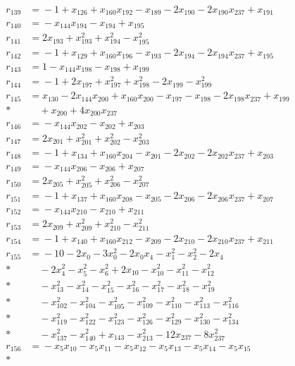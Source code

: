 \documentclass[11pt]{article}
\theoremstyle{remark}\newtheorem{remark}[theorem]{Remark}
\begin{document}
\begin{align*}
r_{139}&={}-1+x_{126}+x_{160}x_{192}-x_{189}-2x_{190}-2x_{190}x_{237}+x_{191}\\[2pt]
r_{140}&={}-x_{144}x_{194}-x_{194}+x_{195}\\[2pt]
r_{141}&={}2x_{193}+x_{193}^{2}+x_{194}^{2}-x_{195}^{2}\\[2pt]
r_{142}&={}-1+x_{129}+x_{160}x_{196}-x_{193}-2x_{194}-2x_{194}x_{237}+x_{195}\\[2pt]
r_{143}&={}1-x_{144}x_{198}-x_{198}+x_{199}\\[2pt]
r_{144}&={}-1+2x_{197}+x_{197}^{2}+x_{198}^{2}-2x_{199}-x_{199}^{2}\\[2pt]
r_{145}&={}x_{130}-2x_{144}x_{200}+x_{160}x_{200}-x_{197}-x_{198}-2x_{198}x_{237}+x_{199}\\*
&\quad{}+x_{200}+4x_{200}x_{237}\\[2pt]
r_{146}&={}-x_{144}x_{202}-x_{202}+x_{203}\\[2pt]
r_{147}&={}2x_{201}+x_{201}^{2}+x_{202}^{2}-x_{203}^{2}\\[2pt]
r_{148}&={}-1+x_{134}+x_{160}x_{204}-x_{201}-2x_{202}-2x_{202}x_{237}+x_{203}\\[2pt]
r_{149}&={}-x_{144}x_{206}-x_{206}+x_{207}\\[2pt]
r_{150}&={}2x_{205}+x_{205}^{2}+x_{206}^{2}-x_{207}^{2}\\[2pt]
r_{151}&={}-1+x_{137}+x_{160}x_{208}-x_{205}-2x_{206}-2x_{206}x_{237}+x_{207}\\[2pt]
r_{152}&={}-x_{144}x_{210}-x_{210}+x_{211}\\[2pt]
r_{153}&={}2x_{209}+x_{209}^{2}+x_{210}^{2}-x_{211}^{2}\\[2pt]
r_{154}&={}-1+x_{140}+x_{160}x_{212}-x_{209}-2x_{210}-2x_{210}x_{237}+x_{211}\\[2pt]
r_{155}&={}-10-2x_{0}-3x_{0}^{2}-2x_{0}x_{4}-x_{1}^{2}-x_{2}^{2}-2x_{4}\\*
&\quad{}-2x_{4}^{2}-x_{5}^{2}-x_{6}^{2}+2x_{10}-x_{10}^{2}-x_{11}^{2}-x_{12}^{2}\\*
&\quad{}-x_{13}^{2}-x_{14}^{2}-x_{15}^{2}-x_{16}^{2}-x_{17}^{2}-x_{18}^{2}-x_{19}^{2}\\*
&\quad{}-x_{102}^{2}-x_{104}^{2}-x_{105}^{2}-x_{109}^{2}-x_{110}^{2}-x_{113}^{2}-x_{116}^{2}\\*
&\quad{}-x_{119}^{2}-x_{122}^{2}-x_{123}^{2}-x_{126}^{2}-x_{129}^{2}-x_{130}^{2}-x_{134}^{2}\\*
&\quad{}-x_{137}^{2}-x_{140}^{2}+x_{143}-x_{213}^{2}-12x_{237}-8x_{237}^{2}\\[2pt]
r_{156}&={}-x_{5}x_{10}-x_{5}x_{11}-x_{5}x_{12}-x_{5}x_{13}-x_{5}x_{14}-x_{5}x_{15}\\*

\end{align*}
\end{document}
